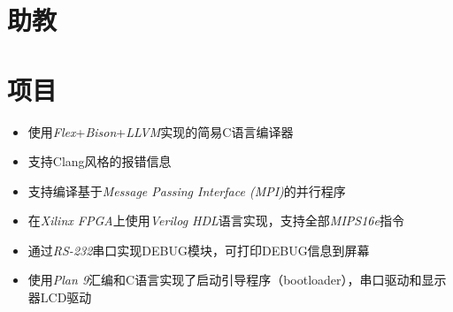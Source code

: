 \documentclass[11pt,a4paper,roman]{moderncv} %
\begin{document}
\section{助教}


\section{项目}

{
	\begin{itemize}
		\item 使用\emph{Flex}+\emph{Bison}+\emph{LLVM}实现的简易C语言编译器
		\item 支持Clang风格的报错信息
		\item 支持编译基于\textit{Message Passing Interface (MPI)}的并行程序
	\end{itemize}
}

{
	\begin{itemize}
    \item 在\emph{Xilinx FPGA}上使用\emph{Verilog HDL}语言实现，支持全部\emph{MIPS16e}指令
		\item 通过\emph{RS-232}串口实现DEBUG模块，可打印DEBUG信息到屏幕 
	\end{itemize}
}

{
	\begin{itemize}
		\item 使用\emph{Plan 9}汇编和C语言实现了启动引导程序（bootloader），串口驱动和显示器LCD驱动
	\end{itemize}
}
\end{document}
